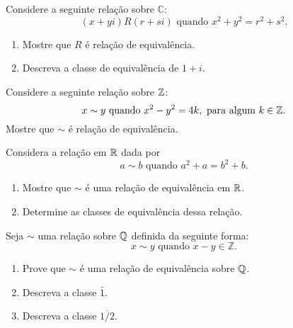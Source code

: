 \documentclass[12pt]{exam}
\begin{document}
    \vspace{.3cm}



    \vspace{.3cm}

    \questao{} Considere a seguinte rela{\c c}{\~a}o sobre $\mathbb{C}$:
    \[
        (x+yi) R (r+si) \mbox{ quando } x^2+y^2=r^2+s^2.
    \]
    \begin{enumerate}[label={\alph*})]
        \item Mostre que $R$ {\'e} rela{\c c}{\~a}o de equival{\^e}ncia.
        \item Descreva a classe de equival{\^e}ncia de $1+i$.
    \end{enumerate}

    \vspace{.3cm}

    \questao{} Considere a seguinte rela\c{c}\~ao sobre $\mathbb{Z}$:
    \[
        x \sim y \mbox{ quando }  x^2 - y^2 = 4k, \mbox{ para algum } k \in \mathbb{Z}.
    \]
    Mostre que $\sim$ {\'e} rela{\c c}{\~a}o de equival{\^e}ncia.

    \vspace{.3cm}

    \questao{} Considera a rela\c{c}\~ao em $\mathbb{R}$ dada por
    \[
        a \sim b \mbox{ quando } a^2 + a = b^2 + b.
    \]
    \begin{enumerate}[label={\alph*})]
        \item Mostre que $\sim$ \'e uma rela\c{c}\~ao de equival\^encia em $\mathbb{R}$.
        \item Determine as classes de equival\^encia dessa rela\c{c}\~ao.
    \end{enumerate}

    \vspace{.3cm}

    \questao{} Seja $\sim$ uma rela{\c c}{\~a}o sobre $\mathbb{Q}$ definida da seguinte forma:
    \[
        x \sim y \mbox{ quando } x - y \in \mathbb{Z}.
    \]
    \begin{enumerate}[label={\alph*})]
        \item Prove que $\sim$ {\'e} uma rela{\c c}{\~a}o de equival{\^e}ncia sobre $\mathbb{Q}$.
        \item Descreva a classe $\bar{1}$.
        \item Descreva a classe $\overline{1/2}$.
    \end{enumerate}
\end{document}
